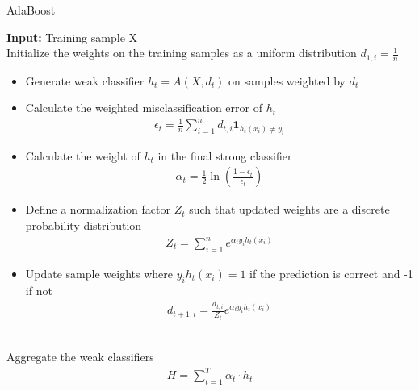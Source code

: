 \documentclass[submission]{eptcs}
\begin{document}
\begin{algorithm}[H]
    \caption{AdaBoost}
    \begin{algorithmic}
        \State \textbf{Input:} Training sample X \\
        
        \State Initialize the weights on the training samples as a uniform distribution $d_{1, i} = \frac{1}{n}$ \\
            \begin{itemize}
                \item Generate weak classifier $h_t = A(X, d_t)$ on samples weighted by $d_t$

                \item Calculate the weighted misclassification error of $h_t$
                \begin{align*}
                    \epsilon_t = \frac{1}{n} \sum_{i=1}^{n} d_{t, i} \mathbf{1}_{h_t(x_i) \neq y_i}
                \end{align*}

                \item Calculate the weight of $h_t$ in the final strong classifier
                \begin{align*}
                    \alpha_t = \frac{1}{2} \ln \left(\frac{1 - \epsilon_t}{\epsilon_t}\right)
                \end{align*}

                \item Define a normalization factor $Z_t$ such that updated weights are a discrete probability distribution
                \begin{align*}
                    Z_t = \sum_{i=1}^{n} e^{\alpha_t y_i h_t(x_i)}
                \end{align*}

                \item Update sample weights where $y_i h_t(x_i) = 1$ if the prediction is correct and -1 if not
                \begin{align*}
                    d_{t+1, i} = \frac{d_{t, i}}{Z_t} e^{\alpha_t y_i h_t(x_i)}
                \end{align*}
            \end{itemize}
        \EndFor \\

        \State Aggregate the weak classifiers
        \begin{align*}
            H = \sum_{t=1}^{T} \alpha_t \cdot h_t
        \end{align*}
    \end{algorithmic}
\end{algorithm}
\end{document}
